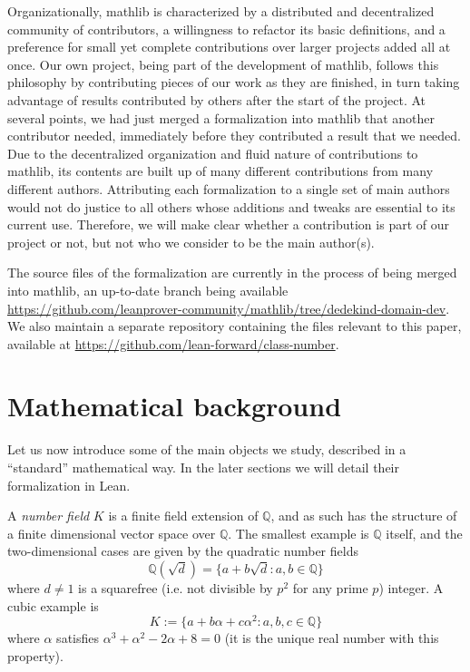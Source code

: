 \documentclass[a4paper,USenglish,cleveref, autoref, thm-restate]{lipics-v2021}
\newcommand{\mathlib}{\textsf{mathlib}\xspace}
\newcommand{\Q}{\mathbb{Q}}
\begin{document}
Organizationally, \mathlib is characterized by a distributed and decentralized community of contributors, a willingness to refactor its basic definitions, and a preference for small yet complete contributions over larger projects added all at once.
Our own project, being part of the development of \mathlib, follows this philosophy by contributing pieces of our work as they are finished,
in turn taking advantage of results contributed by others after the start of the project.
At several points, we had just merged a formalization into \mathlib that another contributor needed,
immediately before they contributed a result that we needed.
Due to the decentralized organization and fluid nature of contributions to mathlib, its contents are built up of many different contributions from many different authors. Attributing each formalization to a single set of main authors would not do justice to all others whose additions and tweaks are essential to its current use. Therefore, we will make clear whether a contribution is part of our project or not, but not who we consider to be the main author(s).

The source files of the formalization are currently in the process of being merged into \mathlib, an up-to-date branch being available \url{https://github.com/leanprover-community/mathlib/tree/dedekind-domain-dev}. We also maintain a separate repository containing the files relevant to this paper, available at \url{https://github.com/lean-forward/class-number}.

\section{Mathematical background}\label{sec math background}

Let us now introduce some of the main objects we study, described in a ``standard'' mathematical way. In the later sections we will detail their formalization in Lean.

A \emph{number field} $K$ is a finite field extension of $\Q$, and as such has the structure of a finite dimensional vector space over $\Q$. The smallest example is $\Q$ itself, and the two-dimensional cases are given by the quadratic number fields
\[
  \Q(\sqrt{d})=\{a+b\sqrt{d} : a,b \in \Q\}
\]
where $d\not=1$ is a squarefree (i.e. not divisible by $p^2$ for any prime $p$) integer. %
A cubic example is
\[K:=\{a+b\alpha+c \alpha^2: a,b,c \in \Q\}\]
where $\alpha$ satisfies $\alpha^3 + \alpha^2 - 2\alpha + 8=0$ (it is the unique real number with this property).
\end{document}
